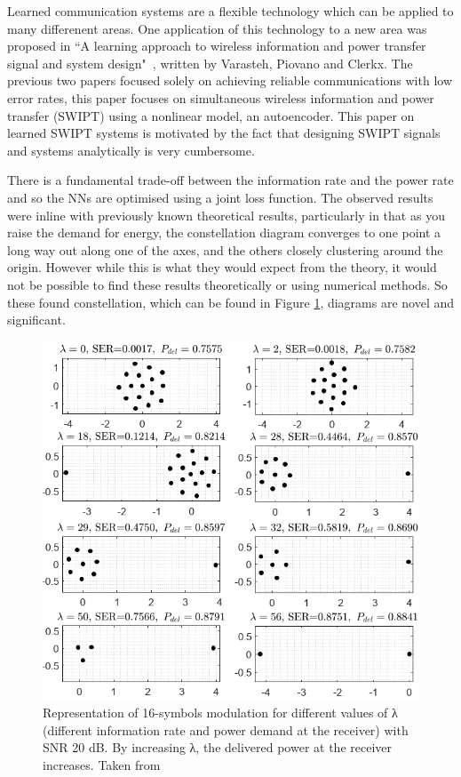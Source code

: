 \documentclass[12pt,onecolumn,letterpaper]{article}
\newcommand\genfigsize{0.5}
\begin{document}
Learned communication systems are a flexible technology which can be applied to many differenent areas. One application of this technology to a new area was proposed in ``A learning approach to wireless information and power transfer signal and system design"~\cite{Clerkx}, written by Varasteh, Piovano and Clerkx. The previous two papers focused solely on achieving reliable communications with low error rates, this paper focuses on simultaneous wireless information and power transfer (SWIPT) using a nonlinear model, an autoencoder. This paper on learned SWIPT systems is motivated by the fact that designing SWIPT signals and systems analytically is very cumbersome. 

There is a fundamental trade-off between the information rate and the power rate and so the NNs are optimised using a joint loss function. The observed results were inline with previously known theoretical results, particularly in that as you raise the demand for energy, the constellation diagram converges to one point a long way out along one of the axes, and the others closely clustering around the origin. However while this is what they would expect from the theory, it would not be possible to find these results theoretically or using numerical methods. So these found constellation, which can be found in Figure \ref{fig:VarastehConstellationDiagrams}, diagrams are novel and significant.

\begin{figure}[t]
   \centering
   \includegraphics[width=\genfigsize\linewidth]{figures/Varasteh_novel_constellation_diagrams.PNG}
   \caption{Representation of 16-symbols modulation for different values of λ (different information rate and power demand at the receiver) with SNR 20 dB. By increasing λ, the delivered power at the receiver increases. Taken from~\cite{Clerkx}}
\label{fig:VarastehConstellationDiagrams}
\end{figure}
\end{document}
